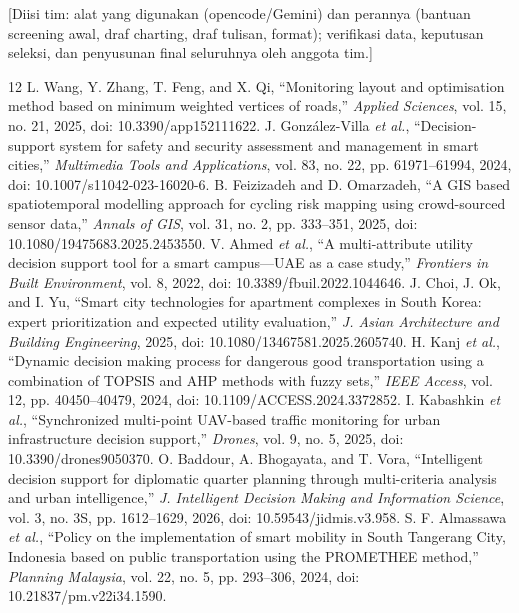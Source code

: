 \documentclass[conference]{IEEEtran}
\begin{document}
[Diisi tim: alat yang digunakan (opencode/Gemini) dan perannya (bantuan screening awal, draf charting, draf tulisan, format); verifikasi data, keputusan seleksi, dan penyusunan final seluruhnya oleh anggota tim.]

\begin{thebibliography}{12}
 L. Wang, Y. Zhang, T. Feng, and X. Qi, ``Monitoring layout and optimisation method based on minimum weighted vertices of roads,'' \emph{Applied Sciences}, vol. 15, no. 21, 2025, doi: 10.3390/app152111622.
 J. Gonz\'{a}lez-Villa \emph{et al.}, ``Decision-support system for safety and security assessment and management in smart cities,'' \emph{Multimedia Tools and Applications}, vol. 83, no. 22, pp. 61971--61994, 2024, doi: 10.1007/s11042-023-16020-6.
 B. Feizizadeh and D. Omarzadeh, ``A GIS based spatiotemporal modelling approach for cycling risk mapping using crowd-sourced sensor data,'' \emph{Annals of GIS}, vol. 31, no. 2, pp. 333--351, 2025, doi: 10.1080/19475683.2025.2453550.
 V. Ahmed \emph{et al.}, ``A multi-attribute utility decision support tool for a smart campus---UAE as a case study,'' \emph{Frontiers in Built Environment}, vol. 8, 2022, doi: 10.3389/fbuil.2022.1044646.
 J. Choi, J. Ok, and I. Yu, ``Smart city technologies for apartment complexes in South Korea: expert prioritization and expected utility evaluation,'' \emph{J. Asian Architecture and Building Engineering}, 2025, doi: 10.1080/13467581.2025.2605740.
 H. Kanj \emph{et al.}, ``Dynamic decision making process for dangerous good transportation using a combination of TOPSIS and AHP methods with fuzzy sets,'' \emph{IEEE Access}, vol. 12, pp. 40450--40479, 2024, doi: 10.1109/ACCESS.2024.3372852.
 I. Kabashkin \emph{et al.}, ``Synchronized multi-point UAV-based traffic monitoring for urban infrastructure decision support,'' \emph{Drones}, vol. 9, no. 5, 2025, doi: 10.3390/drones9050370.
 O. Baddour, A. Bhogayata, and T. Vora, ``Intelligent decision support for diplomatic quarter planning through multi-criteria analysis and urban intelligence,'' \emph{J. Intelligent Decision Making and Information Science}, vol. 3, no. 3S, pp. 1612--1629, 2026, doi: 10.59543/jidmis.v3.958.
 S. F. Almassawa \emph{et al.}, ``Policy on the implementation of smart mobility in South Tangerang City, Indonesia based on public transportation using the PROMETHEE method,'' \emph{Planning Malaysia}, vol. 22, no. 5, pp. 293--306, 2024, doi: 10.21837/pm.v22i34.1590.

\end{thebibliography}
\end{document}
